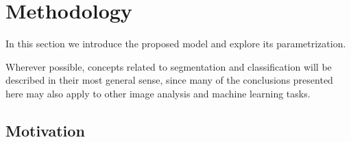 \chapter{Methodology}
In this section we introduce the proposed model and explore its parametrization.
\par
Wherever possible, concepts related to segmentation and classification will be described in their most general sense, since many of the conclusions presented here may also apply to other image analysis and machine learning tasks.
\section{Motivation}

%
%
%
%
%
%
%
%
%
%

